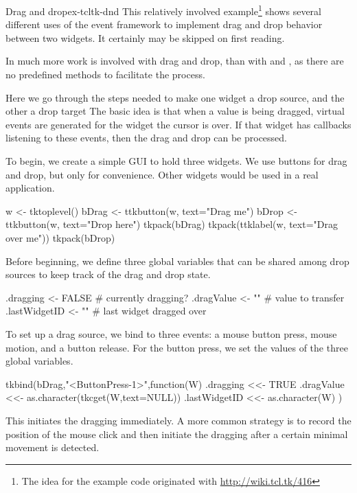 \begin{example}{Drag and drop}{ex-tcltk-dnd}
This relatively involved example\footnote{The idea for the example
  code originated with \url{http://wiki.tcl.tk/416}} shows several
different uses of the event framework to implement drag and drop
behavior between two widgets. It certainly may be skipped on first reading.


In  much more work is involved with drag and drop, than
with  and , as there are no predefined methods
to facilitate the process. 

Here we go through the steps needed to make one widget a drop source,
and the other a drop target The basic idea is that when a value is
being dragged, virtual events are generated for the widget the cursor
is over. If that widget has callbacks listening to these events, then the
drag and drop can be processed.


To begin, we create a simple GUI to hold three widgets. We use buttons
for drag and drop, but only for convenience. Other widgets would be
used in a real application.
\begin{Schunk}
\begin{Sinput}
 w <- tktoplevel()
 bDrag <- ttkbutton(w, text="Drag me")
 bDrop <- ttkbutton(w, text="Drop here")
 tkpack(bDrag)
 tkpack(ttklabel(w, text="Drag over me"))
 tkpack(bDrop)
\end{Sinput}
\end{Schunk}
%

Before beginning, we define three global variables that can be shared
among drop sources to keep track of the drag and drop state. 
\begin{Schunk}
\begin{Sinput}
 .dragging <- FALSE                 # currently dragging?
 .dragValue <- ""                   # value to transfer
 .lastWidgetID <- ""                # last widget dragged over
\end{Sinput}
\end{Schunk}
%
%
To set up a drag source, we bind to three events: a mouse button
press, mouse motion, and a button release. For the button press, we
set the values of the three global variables.
\begin{Schunk}
\begin{Sinput}
 tkbind(bDrag,"<ButtonPress-1>",function(W) {
   .dragging <<-  TRUE
   .dragValue <<- as.character(tkcget(W,text=NULL))
   .lastWidgetID <<- as.character(W)
 })
\end{Sinput}
\end{Schunk}
%
This initiates the dragging immediately. A more common strategy is to
record the position of the mouse click and then initiate the dragging
after a certain minimal movement is detected.


\end{example}
